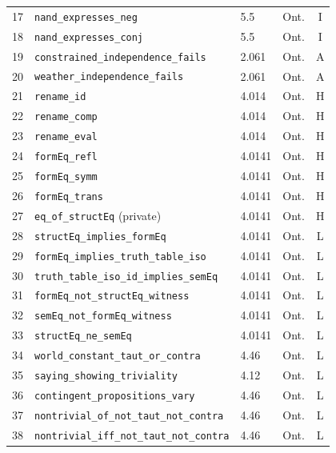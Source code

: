 \documentclass[10pt, letterpaper]{article}
\theoremstyle{definition}
\theoremstyle{remark}
\begin{document}
\begin{table}[p]
\begin{tabular}{@{}rlllc@{}}
17 & \texttt{nand\_expresses\_neg}                       & 5.5     & Ont. & I \\
18 & \texttt{nand\_expresses\_conj}                      & 5.5     & Ont. & I \\
19 & \texttt{constrained\_independence\_fails}           & 2.061   & Ont. & A \\
20 & \texttt{weather\_independence\_fails}               & 2.061   & Ont. & A \\
21 & \texttt{rename\_id}                                 & 4.014   & Ont. & H \\
22 & \texttt{rename\_comp}                               & 4.014   & Ont. & H \\
23 & \texttt{rename\_eval}                               & 4.014   & Ont. & H \\
24 & \texttt{formEq\_refl}                               & 4.0141  & Ont. & H \\
25 & \texttt{formEq\_symm}                               & 4.0141  & Ont. & H \\
26 & \texttt{formEq\_trans}                              & 4.0141  & Ont. & H \\
27 & \texttt{eq\_of\_structEq} (private)                 & 4.0141  & Ont. & H \\
28 & \texttt{structEq\_implies\_formEq}                  & 4.0141  & Ont. & L \\
29 & \texttt{formEq\_implies\_truth\_table\_iso}         & 4.0141  & Ont. & L \\
30 & \texttt{truth\_table\_iso\_id\_implies\_semEq}      & 4.0141  & Ont. & L \\
31 & \texttt{formEq\_not\_structEq\_witness}             & 4.0141  & Ont. & L \\
32 & \texttt{semEq\_not\_formEq\_witness}                & 4.0141  & Ont. & L \\
33 & \texttt{structEq\_ne\_semEq}                        & 4.0141  & Ont. & L \\
34 & \texttt{world\_constant\_taut\_or\_contra}          & 4.46    & Ont. & L \\
35 & \texttt{saying\_showing\_triviality}                & 4.12    & Ont. & L \\
36 & \texttt{contingent\_propositions\_vary}             & 4.46    & Ont. & L \\
37 & \texttt{nontrivial\_of\_not\_taut\_not\_contra}     & 4.46    & Ont. & L \\
38 & \texttt{nontrivial\_iff\_not\_taut\_not\_contra}    & 4.46    & Ont. & L \\

\end{tabular}
\end{table}
\end{document}
